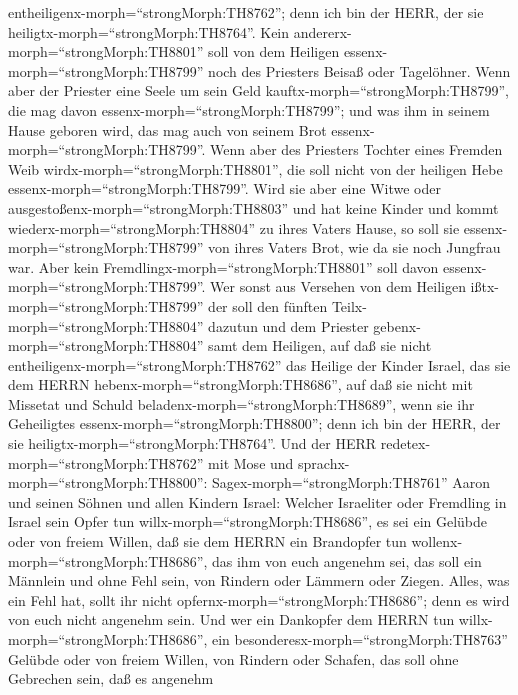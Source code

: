 entheiligenx-morph=``strongMorph:TH8762''; denn ich bin der HERR, der
sie heiligtx-morph=``strongMorph:TH8764''.  Kein
andererx-morph=``strongMorph:TH8801'' soll von dem Heiligen
essenx-morph=``strongMorph:TH8799'' noch des Priesters Beisaß oder
Tagelöhner.  Wenn aber der Priester eine Seele um sein Geld
kauftx-morph=``strongMorph:TH8799'', die mag davon
essenx-morph=``strongMorph:TH8799''; und was ihm in seinem Hause geboren
wird, das mag auch von seinem Brot essenx-morph=``strongMorph:TH8799''.
 Wenn aber des Priesters Tochter eines Fremden Weib
wirdx-morph=``strongMorph:TH8801'', die soll nicht von der heiligen Hebe
essenx-morph=``strongMorph:TH8799''.  Wird sie aber eine
Witwe oder ausgestoßenx-morph=``strongMorph:TH8803'' und hat keine
Kinder und kommt wiederx-morph=``strongMorph:TH8804'' zu ihres Vaters
Hause, so soll sie essenx-morph=``strongMorph:TH8799'' von ihres Vaters
Brot, wie da sie noch Jungfrau war. Aber kein
Fremdlingx-morph=``strongMorph:TH8801'' soll davon
essenx-morph=``strongMorph:TH8799''.  Wer sonst aus
Versehen von dem Heiligen ißtx-morph=``strongMorph:TH8799'' der soll den
fünften Teilx-morph=``strongMorph:TH8804'' dazutun und dem Priester
gebenx-morph=``strongMorph:TH8804'' samt dem Heiligen,  auf
daß sie nicht entheiligenx-morph=``strongMorph:TH8762'' das Heilige der
Kinder Israel, das sie dem HERRN hebenx-morph=``strongMorph:TH8686'',
 auf daß sie nicht mit Missetat und Schuld
beladenx-morph=``strongMorph:TH8689'', wenn sie ihr Geheiligtes
essenx-morph=``strongMorph:TH8800''; denn ich bin der HERR, der sie
heiligtx-morph=``strongMorph:TH8764''.  Und der HERR
redetex-morph=``strongMorph:TH8762'' mit Mose und
sprachx-morph=``strongMorph:TH8800'': 
Sagex-morph=``strongMorph:TH8761'' Aaron und seinen Söhnen und allen
Kindern Israel: Welcher Israeliter oder Fremdling in Israel sein Opfer
tun willx-morph=``strongMorph:TH8686'', es sei ein Gelübde oder von
freiem Willen, daß sie dem HERRN ein Brandopfer tun
wollenx-morph=``strongMorph:TH8686'', das ihm von euch angenehm sei,
 das soll ein Männlein und ohne Fehl sein, von Rindern oder
Lämmern oder Ziegen.  Alles, was ein Fehl hat, sollt ihr
nicht opfernx-morph=``strongMorph:TH8686''; denn es wird von euch nicht
angenehm sein.  Und wer ein Dankopfer dem HERRN tun
willx-morph=``strongMorph:TH8686'', ein
besonderesx-morph=``strongMorph:TH8763'' Gelübde oder von freiem Willen,
von Rindern oder Schafen, das soll ohne Gebrechen sein, daß es angenehm
